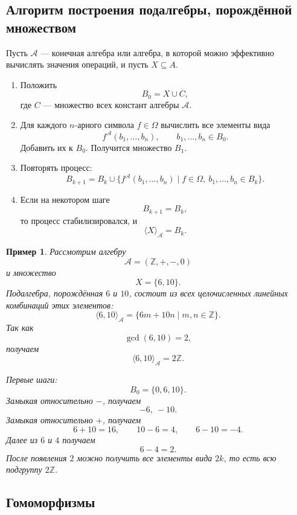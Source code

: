 \documentclass[12pt,a4paper]{article}
\newtheorem{example}{Пример}
\begin{document}
\subsection{Алгоритм построения подалгебры, порождённой множеством}

Пусть $\mathcal A$ --- конечная алгебра или алгебра, в которой можно эффективно вычислять значения операций, и пусть $X\subseteq A$.

\begin{algorithm}
\caption{Построение $\langle X\rangle_{\mathcal A}$}
\leavevmode
\begin{enumerate}
    \item Положить
    \[
    B_0=X\cup C,
    \]
    где $C$ --- множество всех констант алгебры $\mathcal A$.
    \item Для каждого $n$-арного символа $f\in\Omega$ вычислить все элементы вида
    \[
    f^{\mathcal A}(b_1,\dots,b_n),
    \qquad b_1,\dots,b_n\in B_0.
    \]
    Добавить их к $B_0$. Получится множество $B_1$.
    \item Повторять процесс:
    \[
    B_{k+1}=B_k\cup
    \{f^{\mathcal A}(b_1,\dots,b_n)\mid f\in\Omega,\ b_1,\dots,b_n\in B_k\}.
    \]
    \item Если на некотором шаге
    \[
    B_{k+1}=B_k,
    \]
    то процесс стабилизировался, и
    \[
    \langle X\rangle_{\mathcal A}=B_k.
    \]
\end{enumerate}
\end{algorithm}

\begin{example}
Рассмотрим алгебру
\[
\mathcal A=(\mathbb Z,+,-,0)
\]
и множество
\[
X=\{6,10\}.
\]
Подалгебра, порождённая $6$ и $10$, состоит из всех целочисленных линейных комбинаций этих элементов:
\[
\langle 6,10\rangle_{\mathcal A}
=
\{6m+10n\mid m,n\in\mathbb Z\}.
\]
Так как
\[
\gcd(6,10)=2,
\]
получаем
\[
\langle 6,10\rangle_{\mathcal A}=2\mathbb Z.
\]

Первые шаги:
\[
B_0=\{0,6,10\}.
\]
Замыкая относительно $-$, получаем
\[
-6,\ -10.
\]
Замыкая относительно $+$, получаем
\[
6+10=16,\qquad 10-6=4,\qquad 6-10=-4.
\]
Далее из $6$ и $4$ получаем
\[
6-4=2.
\]
После появления $2$ можно получить все элементы вида $2k$, то есть всю подгруппу $2\mathbb Z$.
\end{example}

\subsection{Гомоморфизмы}
\end{document}
